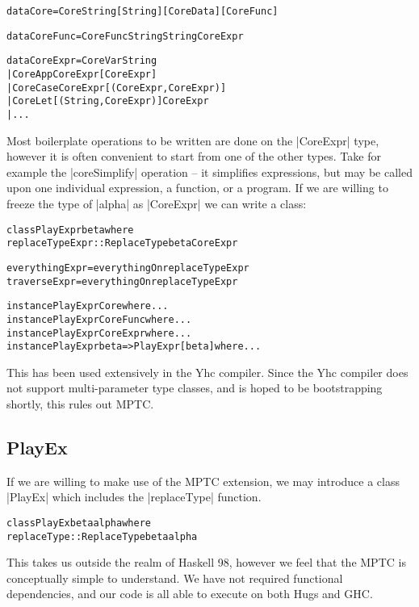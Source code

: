 \documentclass[preprint]{sigplanconf}
\newenvironment{code}{\begin{alltt}\small}{\end{alltt}}
\begin{document}
\begin{code}
data Core = Core String [String] [CoreData] [CoreFunc]

data CoreFunc = CoreFunc String String CoreExpr

data CoreExpr  =  CoreVar   String
               |  CoreApp   CoreExpr  [CoreExpr]
               |  CoreCase  CoreExpr  [(CoreExpr, CoreExpr)]
               |  CoreLet   [(String, CoreExpr)] CoreExpr
               |  ...
\end{code}

Most boilerplate operations to be written are done on the |CoreExpr| type, however it is often convenient to start from one of the other types. Take for example the |coreSimplify| operation -- it simplifies expressions, but may be called upon one individual expression, a function, or a program. If we are willing to freeze the type of |alpha| as |CoreExpr| we can write a class:

\begin{code}
class  PlayExpr beta where
       replaceTypeExpr :: ReplaceType beta CoreExpr

everythingExpr = everythingOn replaceTypeExpr
traverseExpr = everythingOn replaceTypeExpr

instance PlayExpr Core where ...
instance PlayExpr CoreFunc where ...
instance PlayExpr CoreExpr where ...
instance PlayExpr beta => PlayExpr [beta] where ...
\end{code}

This has been used extensively in the Yhc compiler. Since the Yhc compiler does not support multi-parameter type classes, and is hoped to be bootstrapping shortly, this rules out MPTC.

\subsection{PlayEx}

If we are willing to make use of the MPTC extension, we may introduce a class |PlayEx| which includes the |replaceType| function.

\begin{code}
class  PlayEx beta alpha where
       replaceType :: ReplaceType beta alpha
\end{code}

This takes us outside the realm of Haskell 98, however we feel that the MPTC is conceptually simple to understand. We have not required functional dependencies, and our code is all able to execute on both Hugs and GHC.
\end{document}
